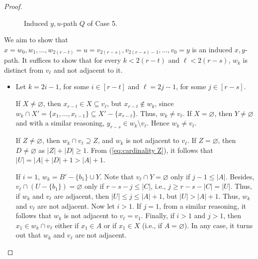 \documentclass[a4paper,11pt]{article}
\renewcommand{\emptyset}{\varnothing}
\begin{document}
\begin{proof}
\begin{description}
\begin{figure}[ht]
    \caption{Induced $y,u$-path $Q$ of Case 5.}
    \label{fig:Kneser-Qcase5}
\end{figure}
        
        We aim to show that $x=w_0,w_1,\ldots,w_{2(r-t)}=u=v_{2(r-s)},v_{2(r-s)-1},\ldots,v_0=y$ is an induced $x,y$-path.
        It suffices to show that for every $k<2(r-t)$ and $\ell<2(r-s)$, $w_k$ is distinct from $v_\ell$ and not adjacent to it.

        \begin{itemize}
            \item Let $k=2i-1$, for some $i\in [r-t]$ and $\ell=2j-1$, for some $j\in [r-s]$.

                If $X\neq \emptyset$, then $x_{r-t}\in X\subseteq v_\ell$, but $x_{r-t}\notin w_k$, since $w_k\cap X'=\{x_1,\ldots,x_{i-1}\}\subseteq X'-\{x_{r-t}\}$. Thus, $w_k\neq v_\ell$. If $X=\emptyset$, then $Y\neq \emptyset$ and with a similar reasoning, $y_{r-s}\in w_k\setminus v_\ell$. Hence $w_k\neq v_\ell$.
        
                If $Z\neq \emptyset$, then $w_k\cap v_\ell\supseteq Z$, and $w_k$ is not adjacent to $v_\ell$. 
                If $Z=\emptyset$, then $D\neq\emptyset$ as $|Z|+|D|\geq 1$. From (\ref{eq:cardinality Z}), it follows that $|U|=|A|+|D|+1>|A|+1$. 
                
                If $i=1$, $w_k=B'-\{b_1\}\cup Y$. Note that $v_\ell\cap Y=\emptyset$ only if $j-1\leq |A|$. Besides, $v_\ell\cap (U-\{b_1\})=\emptyset$ only if $r-s-j\leq |C|$, i.e., $j\geq r-s-|C|=|U|$. Thus, if $w_k$ and $v_\ell$ are adjacent, then $|U|\leq j\leq |A|+1$, but $|U|>|A|+1$. Thus, $w_k$ and $v_\ell$ are not adjacent. 
                Now let $i > 1$. If $j=1$, from a similar reasoning, it follows that $w_k$ is not adjacent to $v_\ell=v_1$. Finally, if $i>1$ and $j>1$, then $x_1\in w_k\cap v_\ell$ either if $x_1\in A$ or if $x_1\in X$ (i.e., if $A=\emptyset$). In any case, it turns out that $w_k$ and $v_\ell$ are not adjacent.
            

\end{itemize}
\end{description}
\end{proof}
\end{document}
